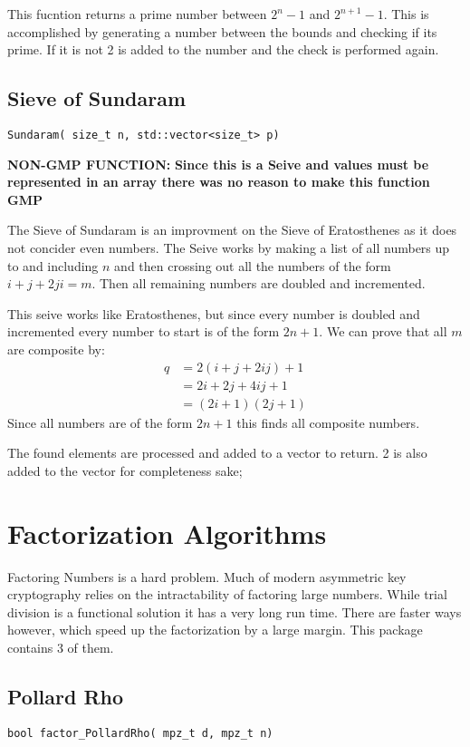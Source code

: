 This fucntion returns a prime number between $2^n -1$ and $2^{n+1}-1$.
This is accomplished by generating a number between the bounds and checking if its prime.
If it is not 2 is added to the number and the check is performed again.

\subsection{Sieve of Sundaram}
\begin{verbatim}
Sundaram( size_t n, std::vector<size_t> p)
\end{verbatim}
\textbf{ NON-GMP FUNCTION:}
\textbf{Since this is a Seive and values must be represented in an array there was no reason to make this function GMP} 

The Sieve of Sundaram is an improvment on the Sieve of Eratosthenes as it does not concider even numbers.
The Seive works by making a list of all numbers up to and including $n$ and then crossing out all the numbers of the form
$i + j + 2ji = m$.
Then all remaining numbers are doubled and incremented.

This seive works like Eratosthenes, but since every number is doubled and incremented every number to start is of the form $2n +1$.
We can prove that all $m$ are composite by:
\begin{align*}
q &= 2(i+j+2ij)+1\\
&= 2i +2j + 4ij + 1\\
&= (2i + 1 )( 2j + 1)
\end{align*}
Since all numbers are of the form $2n + 1$ this finds all composite numbers.

The found elements are processed and added to a vector to return.
2 is also added to the vector for completeness sake;

\section{Factorization Algorithms}

Factoring Numbers is a hard problem. 
Much of modern asymmetric key cryptography relies on the intractability of factoring large numbers.
While trial division is a functional solution it has a very long run time.
There are faster ways however, which speed up the factorization by a large margin.
This package contains 3 of them.

\subsection{Pollard Rho}
\begin{verbatim}
bool factor_PollardRho( mpz_t d, mpz_t n)
\end{verbatim}

